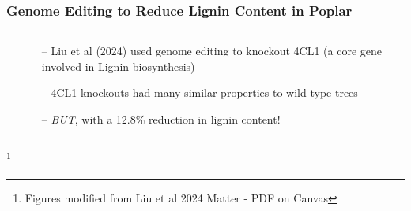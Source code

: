 \documentclass[xcolor=dvipsnames]{beamer}
\newcommand\blfootnote[1]{%
	\begingroup
	\renewcommand\thefootnote{}\footnote{#1}%
	\addtocounter{footnote}{-1}%
	\endgroup
}
\begin{document}
\begin{frame}
	\frametitle{Genome Editing to Reduce Lignin Content in Poplar}
	
	
	\begin{columns}
		\begin{column}{0.5\textwidth}
		\end{column}
		\begin{column}{0.5\textwidth}
	\begin{itemize}
	\item[--] Liu et al (2024) used genome editing to knockout 4CL1 (a core gene involved in Lignin biosynthesis)
	\item[--] 4CL1 knockouts had many similar properties to wild-type trees
	\item[--] \textit{BUT}, with a 12.8\% reduction in lignin content!
	
\end{itemize}

		\end{column}
	\end{columns}
	
	
	\blfootnote{Figures modified from Liu et al 2024 Matter - PDF on Canvas}
\end{frame}
\end{document}
